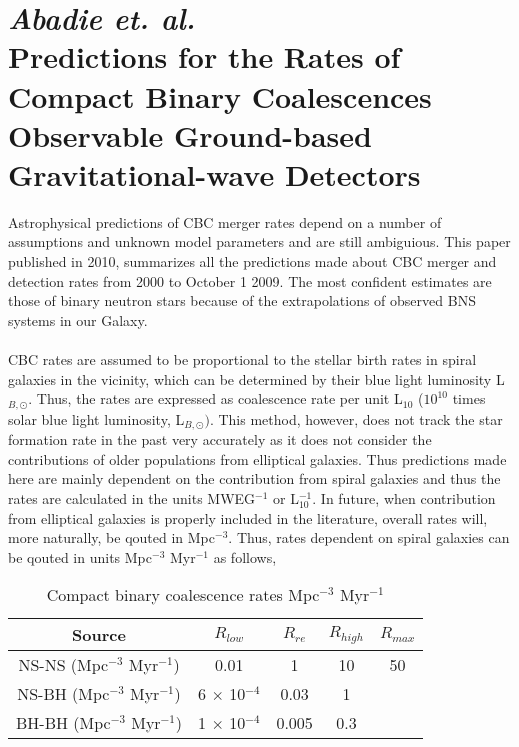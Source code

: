 \documentclass{article}
\numberwithin{equation}{section}
\begin{document}
\section*{\normalsize{\textit{Abadie et. al.\\}}\small{Predictions for the Rates of Compact Binary Coalescences Observable Ground-based Gravitational-wave Detectors}}
Astrophysical predictions of CBC merger rates depend on a number of assumptions and unknown model parameters and are still ambiguious. This paper published in 2010, summarizes all the predictions made about CBC merger and detection rates from 2000 to October 1 2009. The most confident estimates are those of binary neutron stars because of the extrapolations of observed BNS systems in our Galaxy.\\
\\
CBC rates are assumed to be proportional to the stellar birth rates in spiral galaxies in the vicinity, which can be determined by their blue light luminosity L$_{B, \odot}$. Thus, the rates are expressed as coalescence rate per unit L$_{10}$ ($10^{10}$ times solar blue light luminosity, L$_{B, \odot})$. This method, however, does not track the star formation rate in the past very accurately as it does not consider the contributions of older populations from elliptical galaxies. Thus predictions made here are mainly dependent on the contribution from spiral galaxies and thus the rates are calculated in the units MWEG$^{-1}$ or L$_{10}^{-1}$. In future, when contribution from elliptical galaxies is properly included in the literature, overall rates will, more naturally, be qouted in Mpc$^{-3}$. Thus, rates dependent on spiral galaxies can be qouted in units Mpc$^{-3}$ Myr$^{-1}$ as follows,
\begin{table}[h!]
	\centering
	\caption{Compact binary coalescence rates Mpc$^{-3}$ Myr$^{-1}$}
	\label{tab:table1}
	\begin{tabular}{ccccc}
		\toprule
		Source & $R_{low}$ & $R_{re}$ & $R_{high}$ & $R_{max}$\\
		\midrule
		NS-NS (Mpc$^{-3}$ Myr$^{-1}$) & 0.01 & 1 & 10 & 50\\
		NS-BH (Mpc$^{-3}$ Myr$^{-1}$) & 6 $\times$ 10$^{-4}$ & 0.03 & 1 & \\
		BH-BH (Mpc$^{-3}$ Myr$^{-1}$) & 1 $\times$ 10$^{-4}$ & 0.005 & 0.3 & \\
		\bottomrule
	\end{tabular}
\end{table}

\newpage


\end{document}
